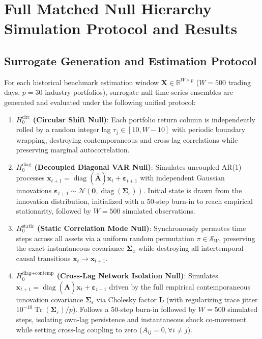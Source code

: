 \documentclass[12pt]{article}
\begin{document}
\section{Full Matched Null Hierarchy Simulation Protocol and Results}
\label{app:null_protocol}

\subsection{Surrogate Generation and Estimation Protocol}
For each historical benchmark estimation window $\mathbf{X} \in \mathbb{R}^{W \times p}$ ($W=500$ trading days, $p=30$ industry portfolios), surrogate null time series ensembles are generated and evaluated under the following unified protocol:
\begin{enumerate}
    \item \textbf{$H_0^{\text{circ}}$ (Circular Shift Null)}: Each portfolio return column is independently rolled by a random integer lag $\tau_j \in [10, W-10]$ with periodic boundary wrapping, destroying contemporaneous and cross-lag correlations while preserving marginal autocorrelation.
    \item \textbf{$H_0^{\text{diag}}$ (Decoupled Diagonal VAR Null)}: Simulates uncoupled AR(1) processes $\mathbf{x}_{t+1} = \operatorname{diag}(\hat{\mathbf{A}})\mathbf{x}_t + \boldsymbol{\varepsilon}_{t+1}$ with independent Gaussian innovations $\boldsymbol{\varepsilon}_{t+1} \sim \mathcal{N}(\mathbf{0}, \operatorname{diag}(\boldsymbol{\Sigma}_\varepsilon))$. Initial state is drawn from the innovation distribution, initialized with a 50-step burn-in to reach empirical stationarity, followed by $W=500$ simulated observations.
    \item \textbf{$H_0^{\text{static}}$ (Static Correlation Mode Null)}: Synchronously permutes time steps across all assets via a uniform random permutation $\pi \in \mathcal{S}_W$, preserving the exact instantaneous covariance $\boldsymbol{\Sigma}_x$ while destroying all intertemporal causal transitions $\mathbf{x}_t \to \mathbf{x}_{t+1}$.
    \item \textbf{$H_0^{\text{diag+contemp}}$ (Cross-Lag Network Isolation Null)}: Simulates $\mathbf{x}_{t+1} = \operatorname{diag}(\hat{\mathbf{A}})\mathbf{x}_t + \boldsymbol{\varepsilon}_{t+1}$ driven by the full empirical contemporaneous innovation covariance $\boldsymbol{\Sigma}_\varepsilon$ via Cholesky factor $\mathbf{L}$ (with regularizing trace jitter $10^{-10}\operatorname{Tr}(\boldsymbol{\Sigma}_\varepsilon)/p$). Follows a 50-step burn-in followed by $W=500$ simulated steps, isolating own-lag persistence and instantaneous shock co-movement while setting cross-lag coupling to zero ($A_{ij}=0, \forall i \neq j$).
\end{enumerate}
\end{document}
